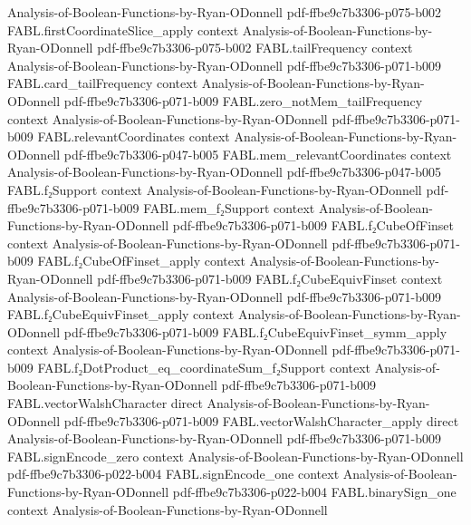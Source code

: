\begin{theorem}
  {Analysis-of-Boolean-Functions-by-Ryan-ODonnell}
  {pdf-ffbe9c7b3306-p075-b002}
\proofstep
  {FABL.firstCoordinateSlice_apply}
  {context}
  {Analysis-of-Boolean-Functions-by-Ryan-ODonnell}
  {pdf-ffbe9c7b3306-p075-b002}
\proofstep
  {FABL.tailFrequency}
  {context}
  {Analysis-of-Boolean-Functions-by-Ryan-ODonnell}
  {pdf-ffbe9c7b3306-p071-b009}
\proofstep
  {FABL.card_tailFrequency}
  {context}
  {Analysis-of-Boolean-Functions-by-Ryan-ODonnell}
  {pdf-ffbe9c7b3306-p071-b009}
\proofstep
  {FABL.zero_notMem_tailFrequency}
  {context}
  {Analysis-of-Boolean-Functions-by-Ryan-ODonnell}
  {pdf-ffbe9c7b3306-p071-b009}
\proofstep
  {FABL.relevantCoordinates}
  {context}
  {Analysis-of-Boolean-Functions-by-Ryan-ODonnell}
  {pdf-ffbe9c7b3306-p047-b005}
\proofstep
  {FABL.mem_relevantCoordinates}
  {context}
  {Analysis-of-Boolean-Functions-by-Ryan-ODonnell}
  {pdf-ffbe9c7b3306-p047-b005}
\proofstep
  {FABL.f₂Support}
  {context}
  {Analysis-of-Boolean-Functions-by-Ryan-ODonnell}
  {pdf-ffbe9c7b3306-p071-b009}
\proofstep
  {FABL.mem_f₂Support}
  {context}
  {Analysis-of-Boolean-Functions-by-Ryan-ODonnell}
  {pdf-ffbe9c7b3306-p071-b009}
\proofstep
  {FABL.f₂CubeOfFinset}
  {context}
  {Analysis-of-Boolean-Functions-by-Ryan-ODonnell}
  {pdf-ffbe9c7b3306-p071-b009}
\proofstep
  {FABL.f₂CubeOfFinset_apply}
  {context}
  {Analysis-of-Boolean-Functions-by-Ryan-ODonnell}
  {pdf-ffbe9c7b3306-p071-b009}
\proofstep
  {FABL.f₂CubeEquivFinset}
  {context}
  {Analysis-of-Boolean-Functions-by-Ryan-ODonnell}
  {pdf-ffbe9c7b3306-p071-b009}
\proofstep
  {FABL.f₂CubeEquivFinset_apply}
  {context}
  {Analysis-of-Boolean-Functions-by-Ryan-ODonnell}
  {pdf-ffbe9c7b3306-p071-b009}
\proofstep
  {FABL.f₂CubeEquivFinset_symm_apply}
  {context}
  {Analysis-of-Boolean-Functions-by-Ryan-ODonnell}
  {pdf-ffbe9c7b3306-p071-b009}
\proofstep
  {FABL.f₂DotProduct_eq_coordinateSum_f₂Support}
  {context}
  {Analysis-of-Boolean-Functions-by-Ryan-ODonnell}
  {pdf-ffbe9c7b3306-p071-b009}
\proofstep
  {FABL.vectorWalshCharacter}
  {direct}
  {Analysis-of-Boolean-Functions-by-Ryan-ODonnell}
  {pdf-ffbe9c7b3306-p071-b009}
\proofstep
  {FABL.vectorWalshCharacter_apply}
  {direct}
  {Analysis-of-Boolean-Functions-by-Ryan-ODonnell}
  {pdf-ffbe9c7b3306-p071-b009}
\proofstep
  {FABL.signEncode_zero}
  {context}
  {Analysis-of-Boolean-Functions-by-Ryan-ODonnell}
  {pdf-ffbe9c7b3306-p022-b004}
\proofstep
  {FABL.signEncode_one}
  {context}
  {Analysis-of-Boolean-Functions-by-Ryan-ODonnell}
  {pdf-ffbe9c7b3306-p022-b004}
\proofstep
  {FABL.binarySign_one}
  {context}
  {Analysis-of-Boolean-Functions-by-Ryan-ODonnell}

\end{theorem}
